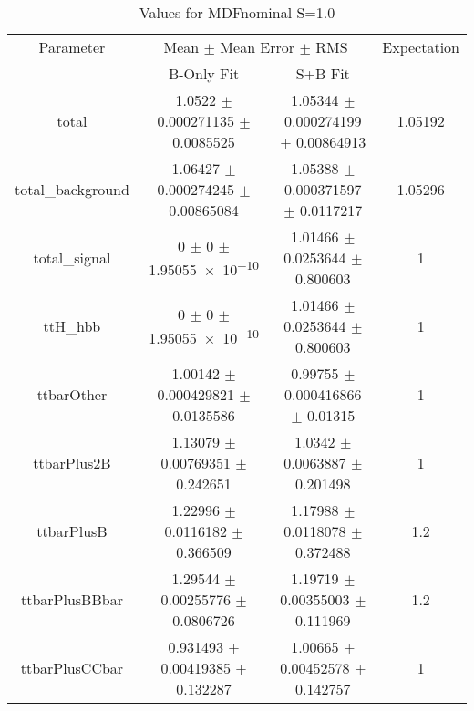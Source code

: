 \begin{table}
\centering
\caption{Values for MDFnominal S=1.0}
\begin{tabular}{cccc}
\toprule
Parameter & \multicolumn{2}{c}{Mean $\pm$ Mean Error $\pm$ RMS} & Expectation\\
 & B-Only Fit & S+B Fit & \\
\midrule
total & \num{1.0522} $\pm$ \num{0.000271135} $\pm$ \num{0.0085525} & \num{1.05344} $\pm$ \num{0.000274199} $\pm$ \num{0.00864913} & \num{1.05192}\\
total\_background & \num{1.06427} $\pm$ \num{0.000274245} $\pm$ \num{0.00865084} & \num{1.05388} $\pm$ \num{0.000371597} $\pm$ \num{0.0117217} & \num{1.05296}\\
total\_signal & \num{0} $\pm$ \num{0} $\pm$ \num{1.95055e-10} & \num{1.01466} $\pm$ \num{0.0253644} $\pm$ \num{0.800603} & \num{1}\\
ttH\_hbb & \num{0} $\pm$ \num{0} $\pm$ \num{1.95055e-10} & \num{1.01466} $\pm$ \num{0.0253644} $\pm$ \num{0.800603} & \num{1}\\
ttbarOther & \num{1.00142} $\pm$ \num{0.000429821} $\pm$ \num{0.0135586} & \num{0.99755} $\pm$ \num{0.000416866} $\pm$ \num{0.01315} & \num{1}\\
ttbarPlus2B & \num{1.13079} $\pm$ \num{0.00769351} $\pm$ \num{0.242651} & \num{1.0342} $\pm$ \num{0.0063887} $\pm$ \num{0.201498} & \num{1}\\
ttbarPlusB & \num{1.22996} $\pm$ \num{0.0116182} $\pm$ \num{0.366509} & \num{1.17988} $\pm$ \num{0.0118078} $\pm$ \num{0.372488} & \num{1.2}\\
ttbarPlusBBbar & \num{1.29544} $\pm$ \num{0.00255776} $\pm$ \num{0.0806726} & \num{1.19719} $\pm$ \num{0.00355003} $\pm$ \num{0.111969} & \num{1.2}\\
ttbarPlusCCbar & \num{0.931493} $\pm$ \num{0.00419385} $\pm$ \num{0.132287} & \num{1.00665} $\pm$ \num{0.00452578} $\pm$ \num{0.142757} & \num{1}\\
\bottomrule
\end{tabular}
\end{table}